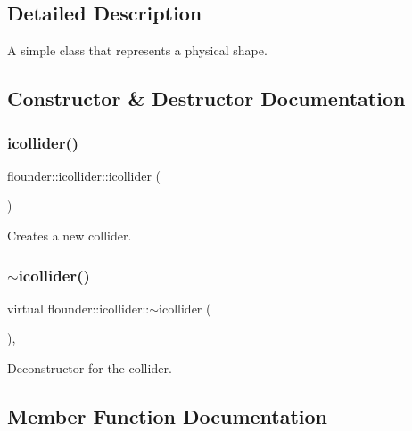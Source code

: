 \subsection{Detailed Description}
A simple class that represents a physical shape. 



\subsection{Constructor \& Destructor Documentation}
\mbox{\label{classflounder_1_1icollider_a75adcd355b80f9def157cde97c89a1fe}} 
\subsubsection{\texorpdfstring{icollider()}{icollider()}}
{\footnotesize\ttfamily flounder\+::icollider\+::icollider (\begin{DoxyParamCaption}{ }\end{DoxyParamCaption})\hspace{0.3cm}{\ttfamily [inline]}}



Creates a new collider. 

\mbox{\label{classflounder_1_1icollider_a8520c4acec0d91cd3d8bf1c381ad2da3}} 
\subsubsection{\texorpdfstring{$\sim$icollider()}{~icollider()}}
{\footnotesize\ttfamily virtual flounder\+::icollider\+::$\sim$icollider (\begin{DoxyParamCaption}{ }\end{DoxyParamCaption})\hspace{0.3cm}{\ttfamily [inline]}, {\ttfamily [virtual]}}



Deconstructor for the collider. 



\subsection{Member Function Documentation}
\mbox{\label{classflounder_1_1icollider_a946ddd743680d0abc7b086d49f882e6f}} 
